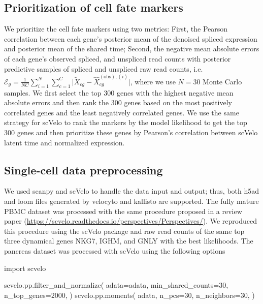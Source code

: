 \documentclass[
  sn-mathphys-num,
  lineno,
  twocolumn]{sn-jnl}
\newenvironment{Shaded}{\begin{snugshade}}{\end{snugshade}}
\newcommand{\DecValTok}[1]{\textcolor[rgb]{0.68,0.00,0.00}{#1}}
\newcommand{\ImportTok}[1]{\textcolor[rgb]{0.00,0.46,0.62}{#1}}
\newcommand{\NormalTok}[1]{\textcolor[rgb]{0.00,0.23,0.31}{#1}}
\newcommand{\OperatorTok}[1]{\textcolor[rgb]{0.37,0.37,0.37}{#1}}
\begin{document}
\subsection{Prioritization of cell fate
markers}\label{sec-methods-fate-markers}

We prioritize the cell fate markers using two metrics: First, the
Pearson correlation between each gene's posterior mean of the denoised
spliced expression and posterior mean of the shared time; Second, the
negative mean absolute errors of each gene's observed spliced, and
unspliced read counts with posterior predictive samples of spliced and
unspliced raw read counts, i.e.
\(\mathcal{E}_g = \frac{1}{NC} \sum_{i=1}^N \sum_{c=1}^{C} \vert \tilde{X}_{cg} - \hat{X}_{cg}^{(\text{obs}), (i)} \vert\),
where we use \(N=30\) Monte Carlo samples. We first select the top
\(300\) genes with the highest negative mean absolute errors and then
rank the \(300\) genes based on the most positively correlated genes and
the least negatively correlated genes. We use the same strategy for
scVelo to rank the markers by the model likelihood to get the top 300
genes and then prioritize these genes by Pearson's correlation between
scVelo latent time and normalized expression.

\subsection{Single-cell data
preprocessing}\label{sec-methods-preprocessing}

We used scanpy and scVelo to handle the data input and output; thus,
both h5ad and loom files generated by velocyto and kallisto
\citep{Melsted2021-ap} are supported. The fully mature PBMC dataset was
processed with the same procedure proposed in a review paper
\citep{Bergen2021-qz}
(\url{https://scvelo.readthedocs.io/perspectives/Perspectives/}). We
reproduced this procedure using the scVelo package and raw read counts
of the same top three dynamical genes NKG7, IGHM, and GNLY with the best
likelihoods. The pancreas dataset was processed with scVelo using the
following options

\begin{Shaded}
\begin{Highlighting}[]
\ImportTok{import}\NormalTok{ scvelo}

\NormalTok{scvelo.pp.filter\_and\_normalize(}
\NormalTok{  adata}\OperatorTok{=}\NormalTok{adata,}
\NormalTok{  min\_shared\_counts}\OperatorTok{=}\DecValTok{30}\NormalTok{, }
\NormalTok{  n\_top\_genes}\OperatorTok{=}\DecValTok{2000}\NormalTok{,}
\NormalTok{)}
\NormalTok{scvelo.pp.moments(}
\NormalTok{  adata,}
\NormalTok{  n\_pcs}\OperatorTok{=}\DecValTok{30}\NormalTok{,}
\NormalTok{  n\_neighbors}\OperatorTok{=}\DecValTok{30}\NormalTok{,}
\NormalTok{)}
\end{Highlighting}
\end{Shaded}
\end{document}
